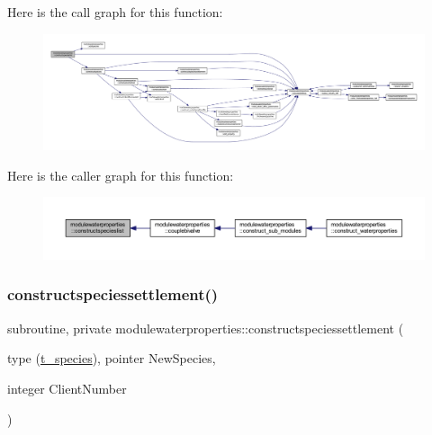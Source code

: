 Here is the call graph for this function\+:\nopagebreak
\begin{figure}[H]
\begin{center}
\leavevmode
\includegraphics[width=350pt]{namespacemodulewaterproperties_aab78d8efe1058e8c8918e9ae266897d0_cgraph}
\end{center}
\end{figure}
Here is the caller graph for this function\+:\nopagebreak
\begin{figure}[H]
\begin{center}
\leavevmode
\includegraphics[width=350pt]{namespacemodulewaterproperties_aab78d8efe1058e8c8918e9ae266897d0_icgraph}
\end{center}
\end{figure}
\mbox{\label{namespacemodulewaterproperties_a3d2b79958b73c28e20d23afd2fe092ef}} 
\subsubsection{\texorpdfstring{constructspeciessettlement()}{constructspeciessettlement()}}
{\footnotesize\ttfamily subroutine, private modulewaterproperties\+::constructspeciessettlement (\begin{DoxyParamCaption}\item[{type (\mbox{\hyperlink{structmodulewaterproperties_1_1t__species}{t\+\_\+species}}), pointer}]{New\+Species,  }\item[{integer}]{Client\+Number }\end{DoxyParamCaption})\hspace{0.3cm}{\ttfamily [private]}}

